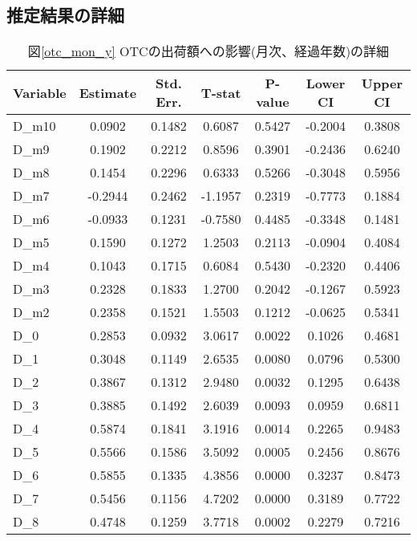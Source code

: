 \documentclass[a4paper,11pt,uplatex]{jsarticle}
\theoremstyle{definition}
\begin{document}
\begin{appendices}
    \section{推定結果の詳細}\label{event_parameter}
    \begin{table}[ht]
        \small
        \centering
        \caption{図\ref{otc_mon_y} OTCの出荷額への影響(月次、経過年数)の詳細}
        \begin{tabular}{lcccccc}
        \hline
        \textbf{Variable} & \textbf{Estimate} & \textbf{Std. Err.} & \textbf{T-stat} & \textbf{P-value} & \textbf{Lower CI} & \textbf{Upper CI} \\
        \hline
        D\_m10 & 0.0902 & 0.1482 & 0.6087 & 0.5427 & -0.2004 & 0.3808 \\
        D\_m9 & 0.1902 & 0.2212 & 0.8596 & 0.3901 & -0.2436 & 0.6240 \\
        D\_m8 & 0.1454 & 0.2296 & 0.6333 & 0.5266 & -0.3048 & 0.5956 \\
        D\_m7 & -0.2944 & 0.2462 & -1.1957 & 0.2319 & -0.7773 & 0.1884 \\
        D\_m6 & -0.0933 & 0.1231 & -0.7580 & 0.4485 & -0.3348 & 0.1481 \\
        D\_m5 & 0.1590 & 0.1272 & 1.2503 & 0.2113 & -0.0904 & 0.4084 \\
        D\_m4 & 0.1043 & 0.1715 & 0.6084 & 0.5430 & -0.2320 & 0.4406 \\
        D\_m3 & 0.2328 & 0.1833 & 1.2700 & 0.2042 & -0.1267 & 0.5923 \\
        D\_m2 & 0.2358 & 0.1521 & 1.5503 & 0.1212 & -0.0625 & 0.5341 \\
        D\_0 & 0.2853 & 0.0932 & 3.0617 & 0.0022 & 0.1026 & 0.4681 \\
        D\_1 & 0.3048 & 0.1149 & 2.6535 & 0.0080 & 0.0796 & 0.5300 \\
        D\_2 & 0.3867 & 0.1312 & 2.9480 & 0.0032 & 0.1295 & 0.6438 \\
        D\_3 & 0.3885 & 0.1492 & 2.6039 & 0.0093 & 0.0959 & 0.6811 \\
        D\_4 & 0.5874 & 0.1841 & 3.1916 & 0.0014 & 0.2265 & 0.9483 \\
        D\_5 & 0.5566 & 0.1586 & 3.5092 & 0.0005 & 0.2456 & 0.8676 \\
        D\_6 & 0.5855 & 0.1335 & 4.3856 & 0.0000 & 0.3237 & 0.8473 \\
        D\_7 & 0.5456 & 0.1156 & 4.7202 & 0.0000 & 0.3189 & 0.7722 \\
        D\_8 & 0.4748 & 0.1259 & 3.7718 & 0.0002 & 0.2279 & 0.7216 \\

\end{tabular}
\end{table}
\end{appendices}
\end{document}
